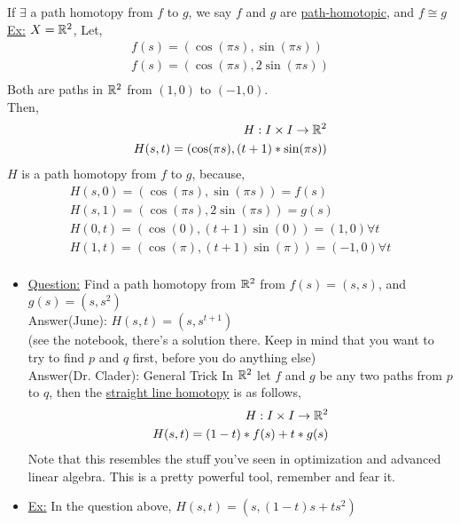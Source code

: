    \begin{definition} If $\exists$ a path homotopy from $f$ to $g$, we say $f$ and $g$ are \underline{path-homotopic}, and $f\cong g$\\
        \underline{Ex:} $X=\mathbb{R}^2$, Let,
        \begin{align*}
            f(s)=(\cos(\pi s), \sin(\pi s))\\
            f(s)=(\cos(\pi s), 2\sin(\pi s))\\
        \end{align*}
        Both are paths in $\mathbb{R}^2$ from $(1,0)$ to $(-1,0)$.\\
        Then,
        \begin{align*}
            H: I\times I \rightarrow \mathbb{R}^2\\
            H(s,t)=(\cos(\pi s), (t+1)*\sin(\pi s))\\
        \end{align*}
        $H$ is a path homotopy from $f$ to $g$, because,
        \begin{align*}
            H(s,0)=(\cos(\pi s), \sin(\pi s))=f(s)\\
            H(s,1)=(\cos(\pi s), 2\sin(\pi s))=g(s)\\
            H(0,t)=(\cos(0), (t+1)\sin(0))=(1,0)\forall t\\
            H(1,t)=(\cos(\pi), (t+1)\sin(\pi))=(-1,0)\forall t\\
        \end{align*}
    \end{definition}
    \begin{itemize}
        \item \underline{Question:} Find a path homotopy from $\mathbb{R}^2$ from $f(s)=(s,s)$, and $g(s)=(s,s^2)$\\
            Answer(June): $H(s,t)=(s,s^{t+1})$\\
            (see the notebook, there's a solution there. Keep in mind that you want to try to find $p$ and $q$ first, before you do anything else)\\
            Answer(Dr. Clader): General Trick In $\mathbb{R}^2$ let $f$ and $g$ be any two paths from $p$ to $q$, then the
            \underline{straight line homotopy} is as follows,
            \begin{align*}
                H: I \times I \rightarrow \mathbb{R}^2\\
                H(s,t)=(1-t)*f(s)+t*g(s)\\
            \end{align*}
            Note that this resembles the stuff you've seen in optimization and advanced linear algebra. This is a pretty powerful tool,
            remember and fear it.
        \item \underline{Ex:} In the question above, $H(s, t)=(s, (1-t)s+ts^2)$
    \end{itemize}
